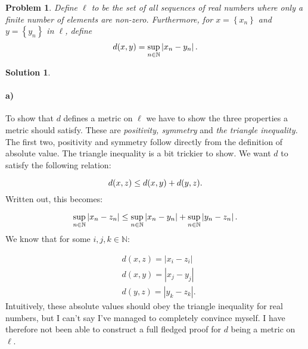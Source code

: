 \documentclass[a4paper]{article}
\newtheorem{prb}{Problem}
\theoremstyle{definition}
\newtheorem{sol}{Solution}
\begin{document}
\begin{prb}
  Define $\ell$ to be the set of all sequences of real numbers where only a
  finite number of elements are non-zero. Furthermore, for $x = \left\{ x_n \right\}$ and
  $y = \left\{ y_n \right\}$ in $\ell$, define
  \begin{equation}
    \notag
    d(x, y) = \sup\limits_{n\in\mathbb{N}} \left| x_n - y_n\right|.
  \end{equation}
\end{prb}

\begin{sol}
\item\paragraph{a)} %

To show that $d$ defines a metric on $\ell$ we have to show the three
properties a metric should satisfy. These are \textit{positivity, symmetry} and
\textit{the triangle inequality.} The first two, positivity and symmetry follow
directly from the definition of absolute value.  The triangle inequality is a
bit trickier to show. We want $d$ to satisfy the following relation:

\begin{equation}
  \notag
  d(x, z) \leq d(x, y) + d(y, z).
\end{equation}
Written out, this becomes:

\begin{equation}
  \notag
  \sup\limits_{n\in\mathbb{N}} \left| x_n - z_n\right| \leq \sup\limits_{n\in\mathbb{N}} \left| x_n - y_n\right| +  \sup\limits_{n\in\mathbb{N}} \left| y_n - z_n\right|.
\end{equation}
We know that for some $i, j, k \in \mathbb{N}$:

\begin{align*}
  &d(x, z) = \left| x_i - z_i \right| \\
  &d(x, y) = \left| x_j - y_j \right| \\
  &d(y, z) = \left| y_k - z_k \right|.
\end{align*}
Intuitively, these absolute values should obey the triangle inequality for real
numbers, but I can't say I've managed to completely convince myself. I have
therefore not been able to construct a full fledged proof for $d$ being a
metric on $\ell$.


\end{sol}
\end{document}
